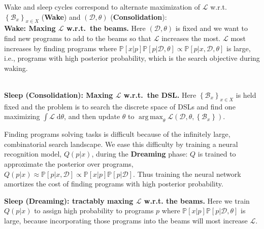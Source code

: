 \documentclass{article}
\newcommand{\lowerBound}{\mathscr{L}}
\DeclareMathOperator*{\argmax}{arg\,max} %
\newcommand{\probability}{\mathds{P}} %
\begin{document}
Wake and sleep cycles correspond to alternate maximization of $\lowerBound$ w.r.t. $\left\{\mathcal{B}_x \right\}_{x\in X}$  (\textbf{Wake})
and $(\mathcal{D},\theta)$ (\textbf{Consolidation}):
\\\noindent \textbf{Wake: Maxing $\lowerBound$ w.r.t.\ the beams.} Here $(\mathcal{D},\theta)$ is fixed and we
want to find new programs to add to  the beams so that $\lowerBound$ increases the most.
$\lowerBound$ most increases by finding programs where $\probability[x|p]\probability[p|\mathcal{D},\theta]\propto\probability[p|x,\mathcal{D},\theta]$ 
is large, i.e., programs with high posterior probability,
which is the search objective during waking.

\\\noindent \textbf{Sleep (Consolidation): Maxing $ \lowerBound$ w.r.t.\ the DSL.} Here $\left\{\mathcal{B}_x \right\}_{x\in X}$ is held fixed and the problem is to search the discrete space of DSLs and find one maximizing $\int \lowerBound \;\mathrm{d}\theta$,
and then update $\theta$ to $\argmax_\theta \lowerBound(\mathcal{D},\theta,\left\{\mathcal{B}_x \right\})$.

Finding programs solving tasks is difficult because of the infinitely
large, combinatorial search landscape. We ease this difficulty by
training a neural recognition model, $Q(p |x )$, during the
\textbf{Dreaming} phase: $Q$ is trained to approximate the posterior
over programs, $Q(p|x)\approx
\probability[p|x,\mathcal{D}]\propto\probability[x|p]\probability[p|\mathcal{D}]$.
Thus training the neural network amortizes the cost of finding
programs with high posterior probability.

\noindent\textbf{Sleep (Dreaming): tractably maxing $\lowerBound$ w.r.t. the
  beams.}  Here we train %
$Q(p|x)$ to assign high probability to programs $p$ where
$\probability[x|p]\probability[p|\mathcal{D},\theta]$ is large, because incorporating those programs
into the beams will most increase $\lowerBound$.
\end{document}
